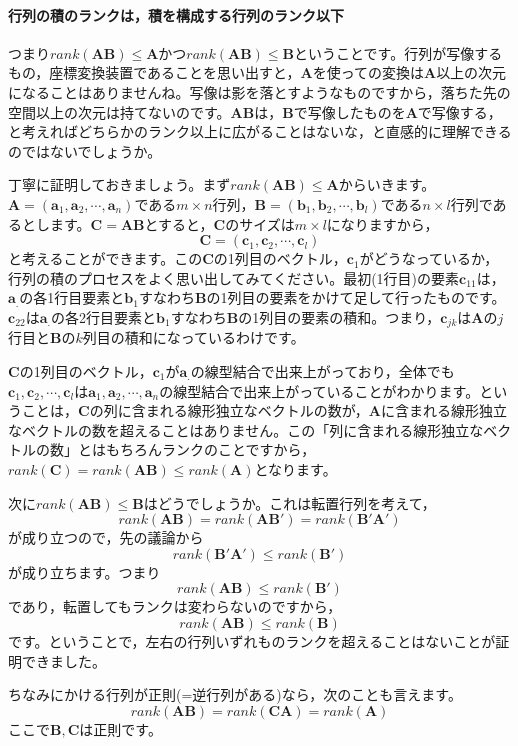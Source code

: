 \documentclass{ltjsbook}
\begin{document}
\paragraph{行列の積のランクは，積を構成する行列のランク以下}つまり$rank(\bm{AB}) \le \bm{A}$かつ$rank(\bm{AB})\le \bm{B}$ということです。行列が写像するもの，座標変換装置であることを思い出すと，$\bm{A}$を使っての変換は$\bm{A}$以上の次元になることはありませんね。写像は影を落とすようなものですから，落ちた先の空間以上の次元は持てないのです。$\bm{AB}$は，$\bm{B}$で写像したものを$\bm{A}$で写像する，と考えればどちらかのランク以上に広がることはないな，と直感的に理解できるのではないでしょうか。

丁寧に証明しておきましょう。まず$rank(\bm{AB}) \le \bm{A}$からいきます。
$\bm{A} = (\bm{a}_1,\bm{a}_2,\cdots,\bm{a}_n)$である$m\times n$行列，$\bm{B}=(\bm{b}_1,\bm{b}_2,\cdots,\bm{b}_l)$である$n \times l $行列であるとします。$\bm{C}=\bm{AB}$とすると，$\bm{C}$のサイズは$m\times l$になりますから，
\[ \bm{C} = (\bm{c}_1,\bm{c}_2,\cdots,\bm{c}_l) \]
と考えることができます。この$\bm{C}$の1列目のベクトル，$\bm{c}_1$がどうなっているか，行列の積のプロセスをよく思い出してみてください。最初(1行目)の要素$\bm{c}_{11}$は，$\bm{a}_.$の各1行目要素と$\bm{b}_1$すなわち$\bm{B}$の1列目の要素をかけて足して行ったものです。$\bm{c}_{22}$は$\bm{a}_.$の各2行目要素と$\bm{b}_1$すなわち$\bm{B}$の1列目の要素の積和。つまり，$\bm{c}_{jk}$は$\bm{A}$の$j$行目と$\bm{B}$の$k$列目の積和になっているわけです。

$\bm{C}$の1列目のベクトル，$\bm{c}_1$が$\bm{a}_.$の線型結合で出来上がっており，全体でも$\bm{c}_1,\bm{c}_2,\cdots,\bm{c}_l$は$\bm{a}_1,\bm{a}_2,\cdots,\bm{a}_n$の線型結合で出来上がっていることがわかります。ということは，$\bm{C}$の列に含まれる線形独立なベクトルの数が，$\bm{A}$に含まれる線形独立なベクトルの数を超えることはありません。この「列に含まれる線形独立なベクトルの数」とはもちろんランクのことですから，$rank(\bm{C}) = rank(\bm{AB}) \le rank(\bm{A})$となります。

次に$rank(\bm{AB}) \le \bm{B}$はどうでしょうか。これは転置行列を考えて，
\[ rank(\bm{AB}) = rank(\bm{AB}') = rank(\bm{B}'\bm{A}') \]
が成り立つので，先の議論から
\[ rank(\bm{B}'\bm{A}') \le rank(\bm{B}') \]
が成り立ちます。つまり
\[ rank(\bm{AB}) \le rank(\bm{B}')\]
であり，転置してもランクは変わらないのですから，
\[ rank(\bm{AB}) \le rank(\bm{B})\]
です。ということで，左右の行列いずれものランクを超えることはないことが証明できました。

ちなみにかける行列が正則(=逆行列がある)なら，次のことも言えます。
\[ rank(\bm{AB})=rank(\bm{CA})=rank(\bm{A}) \]
ここで$\bm{B},\bm{C}$は正則です。
\end{document}
